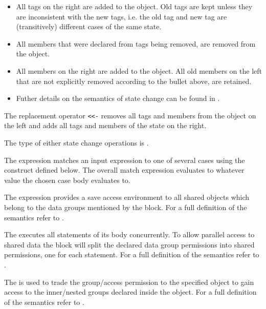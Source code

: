 \begin{itemize}

\item
All tags on the right are added to the object.  Old tags are kept
unless they are inconsistent with the new tags, i.e. the old tag and
new tag are (transitively) different cases of the same state.

\item
All members that were declared from tags being removed, are removed from
the object.

\item
All members on the right are added to the object.  All old members on
the left that are not explicitly removed according to the bullet
above, are retained.  

\item 
Futher details on the semantics of state change can be found in \citet{sunshine2011}.

\end{itemize}

The replacement operator \texttt{<{}<-} removes all tags and members from the object on the left and adds all tags and members of the state on the right.   

The type of either state change operations is .

The  expression matches an input expression to one of
several cases using the  construct defined below.
The overall match expression evaluates to whatever value the
chosen case body evaluates to.

The  expression provides a save access environment to all
shared objects which belong to the data groups mentioned by the
 block. For a full definition of the semantics refer to
\citet{stork09:concurrency_by_default, stork10:uaeminium_spec}.

The  executes all statements of its body concurrently. To
allow parallel access to shared data the  block will split
the declared data group permissions into shared permissions, one for
each statement. For a full definition of the semantics refer to
\cite{stork09:concurrency_by_default, stork10:uaeminium_spec}.

The  is used to trade the group/access permission to the
specified object to gain access to the inner/nested groups declared
inside the object. For a full definition of the semantics refer to
\cite{stork09:concurrency_by_default, stork10:uaeminium_spec}.

